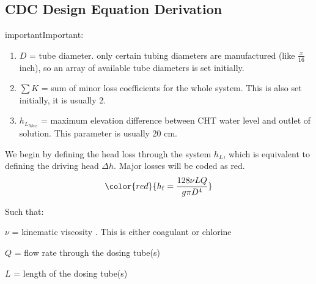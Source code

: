 \documentclass[letterpaper,10pt,english]{sphinxmanual}
\begin{document}
\subsection{CDC Design Equation Derivation}
\label{\detokenize{Flow_Control_and_Measurement/FCM_Derivations:cdc-design-equation-derivation}}\label{\detokenize{Flow_Control_and_Measurement/FCM_Derivations:heading-cdc-design-equation-derivations}}
\begin{sphinxadmonition}{important}{Important:}
\end{sphinxadmonition}
\begin{enumerate}
\item {} 
\(D\) = tube diameter. only certain tubing diameters are manufactured (like \(\frac{x}{16}\) inch), so an array of available tube diameters is set initially.

\item {} 
\(\sum K\) = sum of minor loss coefficients for the whole system. This is also set initially, it is usually 2.

\item {} 
\(h_{L_{Max}}\) = maximum elevation difference between CHT water level and outlet of solution. This parameter is usually 20 cm.

\end{enumerate}

We begin by defining the head loss through the system \(h_L\), which is equivalent to defining the driving head \(\Delta h\). Major losses will be coded as red.
\begin{equation}\label{equation:Flow_Control_and_Measurement/FCM_Derivations:Flow_Control_and_Measurement/FCM_Derivations:20}
\begin{split}\color{red}{
  h_{\rm{f}} = \frac{128\nu LQ}{g\pi D^4}
  }\end{split}
\end{equation}
\begin{DUlineblock}{0em}
\item[] Such that:
\item[] \(\nu\) = kinematic viscosity . This is either coagulant or chlorine
\item[] \(Q\) = flow rate through the dosing tube(s)
\item[] \(L\) = length of the dosing tube(s)
\end{DUlineblock}
\end{document}
